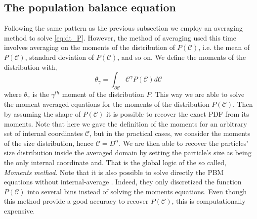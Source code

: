 \subsection{The population balance equation}

Following the same pattern as the previous subsection we employ an averaging method to solve \ref{eq:dt_P}.
However, the method of averaging used this time involves averaging on the moments of the distribution of $P(\mathscr{C})$, i.e. the mean of $P(\mathscr{C})$, standard deviation of $P(\mathscr{C})$, and so on. 
We define the moments of the distribution with, 
\begin{equation}
    \theta_{\gamma} = \int_{\partial \mathscr{C}} \mathscr{C}^\gamma P(\mathscr{C})  d\mathscr{C}
    \label{eq:g}
\end{equation}
where $\theta_{\gamma}$ is the $\gamma^{th}$ moment of the distribution $P$.
This way we are able to solve the moment averaged equations for the moments of the distribution $P(\mathscr{C})$. 
Then by assuming the shape of $P(\mathscr{C})$ it is possible to recover the exact PDF from its moments.
Note that here we gave the definition of the moments for an arbitrary set of internal coordinates $\mathscr{C}$, but in the practical cases, we consider the moments of the size distribution, hence $\mathscr{C} = D^\alpha$.
We are then able to recover the particles' size distribution inside the averaged domain by setting the particle's size as being the only internal coordinate and.
That is the global logic of the so called, \textit{Moments method}.  
Note that it is also possible to solve directly the PBM equations without internal-average \citep{salehi2017population}.
Indeed, they only discretized the function $P(\mathscr{C})$ into several bins instead of solving the moments equations. 
Even though this method provide a good accuracy to recover $P(\mathscr{C})$, this is computationally expensive.

